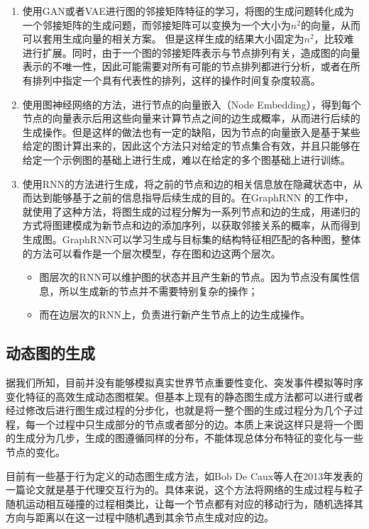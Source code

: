 \begin{enumerate}
  \item 使用GAN或者VAE进行图的邻接矩阵特征的学习，将图的生成问题转化成为一个邻接矩阵的生成问题，而邻接矩阵可以变换为一个大小为$n^2$的向量，从而可以套用生成向量的相关方案。
  但是这样生成的结果大小固定为$n^2$，比较难进行扩展。同时，由于一个图的邻接矩阵表示与节点排列有关，造成图的向量表示的不唯一性，因此可能需要对所有可能的节点排列都进行分析，或者在所有排列中指定一个具有代表性的排列，这样的操作时间复杂度较高。
  \item 使用图神经网络的方法，进行节点的向量嵌入（Node Embedding），得到每个节点的向量表示后用这些向量来计算节点之间的边生成概率，从而进行后续的生成操作。但是这样的做法也有一定的缺陷，因为节点的向量嵌入是基于某些给定的图计算出来的，因此这个方法只对给定的节点集合有效，并且只能够在给定一个示例图的基础上进行生成，难以在给定的多个图基础上进行训练。
  \item 使用RNN的方法进行生成，将之前的节点和边的相关信息放在隐藏状态中，从而达到能够基于之前的信息指导后续生成的目的。在GraphRNN \cite{You2018GraphRNN} 的工作中，就使用了这种方法，将图生成的过程分解为一系列节点和边的生成，用递归的方式将图建模成为新节点和边的添加序列，以获取邻接关系的概率，从而得到生成图。GraphRNN可以学习生成与目标集的结构特征相匹配的各种图，整体的方法可以看作是一个层次模型，存在图和边这两个层次。
  \begin{itemize}
    \item 图层次的RNN可以维护图的状态并且产生新的节点。因为节点没有属性信息，所以生成新的节点并不需要特别复杂的操作；
    \item 而在边层次的RNN上，负责进行新产生节点上的边生成操作。
  \end{itemize}
\end{enumerate}

\vspace{0.2cm}

\subsection{动态图的生成}

据我们所知，目前并没有能够模拟真实世界节点重要性变化、突发事件模拟等时序变化特征的高效生成动态图框架\cite{8573573}\cite{DANCer}。但基本上现有的静态图生成方法都可以进行或者经过修改后进行图生成过程的分步化，也就是将一整个图的生成过程分为几个子过程，每一个过程中只生成部分的节点或者部分的边。本质上来说这样只是将一个图的生成分为几步，生成的图遵循同样的分布，不能体现总体分布特征的变化与一些节点的变化。

目前有一些基于行为定义的动态图生成方法，如Bob De Caux等人在2013年发表的一篇论文\cite{De2014Dynamic}就是基于代理交互行为的。具体来说，这个方法将网络的生成过程与粒子随机运动相互碰撞的过程相类比，让每一个节点都有对应的移动行为，随机选择其方向与距离以在这一过程中随机遇到其余节点生成对应的边。


